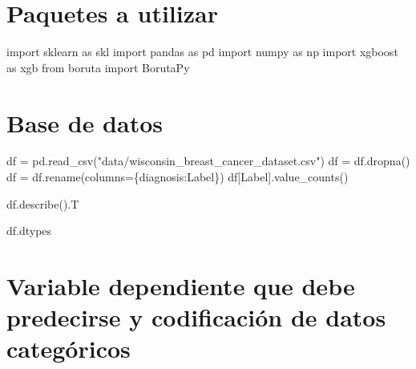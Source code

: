 \documentclass[
]{article}
\author{}
\date{}
\newenvironment{Shaded}{}{}
\newcommand{\ImportTok}[1]{#1}
\newcommand{\NormalTok}[1]{#1}
\newcommand{\OperatorTok}[1]{\textcolor[rgb]{0.40,0.40,0.40}{#1}}
\newcommand{\StringTok}[1]{\textcolor[rgb]{0.25,0.44,0.63}{#1}}
\begin{document}
\hypertarget{paquetes-a-utilizar}{%
\section{Paquetes a utilizar}\label{paquetes-a-utilizar}}

\begin{Shaded}
\begin{Highlighting}[]
\ImportTok{import}\NormalTok{ sklearn }\ImportTok{as}\NormalTok{ skl}
\ImportTok{import}\NormalTok{ pandas }\ImportTok{as}\NormalTok{ pd}
\ImportTok{import}\NormalTok{ numpy }\ImportTok{as}\NormalTok{ np}
\ImportTok{import}\NormalTok{ xgboost }\ImportTok{as}\NormalTok{ xgb}
\ImportTok{from}\NormalTok{ boruta }\ImportTok{import}\NormalTok{ BorutaPy}
\end{Highlighting}
\end{Shaded}

\hypertarget{base-de-datos}{%
\section{Base de datos}\label{base-de-datos}}

\begin{Shaded}
\begin{Highlighting}[]
\NormalTok{df }\OperatorTok{=}\NormalTok{ pd.read\_csv(}\StringTok{"data/wisconsin\_breast\_cancer\_dataset.csv"}\NormalTok{)}
\NormalTok{df }\OperatorTok{=}\NormalTok{ df.dropna()}
\NormalTok{df }\OperatorTok{=}\NormalTok{ df.rename(columns}\OperatorTok{=}\NormalTok{\{}\StringTok{\textquotesingle{}diagnosis\textquotesingle{}}\NormalTok{:}\StringTok{\textquotesingle{}Label\textquotesingle{}}\NormalTok{\})}
\NormalTok{df[}\StringTok{\textquotesingle{}Label\textquotesingle{}}\NormalTok{].value\_counts()}
\end{Highlighting}
\end{Shaded}

\begin{Shaded}
\begin{Highlighting}[]
\NormalTok{df.describe().T}
\end{Highlighting}
\end{Shaded}

\begin{Shaded}
\begin{Highlighting}[]
\NormalTok{df.dtypes}
\end{Highlighting}
\end{Shaded}

\hypertarget{variable-dependiente-que-debe-predecirse-y-codificaciuxf3n-de-datos-categuxf3ricos}{%
\section{Variable dependiente que debe predecirse y codificación de
datos
categóricos}\label{variable-dependiente-que-debe-predecirse-y-codificaciuxf3n-de-datos-categuxf3ricos}}
\end{document}

